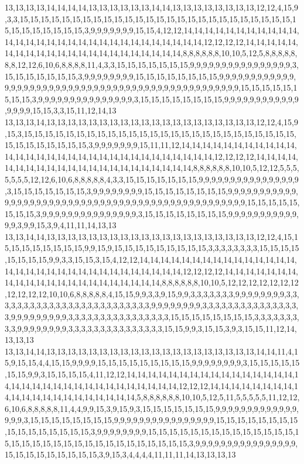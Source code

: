 13,13,13,13,14,14,14,14,13,13,13,13,13,13,14,14,13,13,13,13,13,13,13,13,12,12,4,15,9,3,3,15,15,15,15,15,15,15,15,15,15,15,15,15,15,15,15,15,15,15,15,15,15,15,15,15,15,15,15,15,15,15,15,15,15,3,9,9,9,9,9,9,9,15,15,4,12,12,14,14,14,14,14,14,14,14,14,14,14,14,14,14,14,14,14,14,14,14,14,14,14,14,14,14,14,14,14,14,12,12,12,12,14,14,14,14,14,14,14,14,14,14,14,14,14,14,14,14,14,14,14,14,14,14,8,8,8,8,8,8,10,10,5,12,5,8,8,8,8,8,8,8,12,12,6,10,6,8,8,8,8,11,4,3,3,15,15,15,15,15,15,15,9,9,9,9,9,9,9,9,9,9,9,9,9,9,9,9,3,15,15,15,15,15,15,15,3,9,9,9,9,9,9,9,9,15,15,15,15,15,15,15,15,9,9,9,9,9,9,9,9,9,9,9,9,9,9,9,9,9,9,9,9,9,9,9,9,9,9,9,9,9,9,9,9,9,9,9,9,9,9,9,9,9,9,9,9,9,9,9,9,9,15,15,15,15,15,15,15,15,3,9,9,9,9,9,9,9,9,9,9,9,9,9,9,9,3,15,15,15,15,15,15,15,15,9,9,9,9,9,9,9,9,9,9,9,9,9,9,9,9,15,15,3,3,15,11,12,14,13
13,13,13,14,13,13,13,13,13,13,13,13,13,13,13,13,13,13,13,13,13,13,13,13,12,12,4,15,9,15,3,15,15,15,15,15,15,15,15,15,15,15,15,15,15,15,15,15,15,15,15,15,15,15,15,15,15,15,15,15,15,15,15,15,15,3,9,9,9,9,9,9,9,15,11,11,12,14,14,14,14,14,14,14,14,14,14,14,14,14,14,14,14,14,14,14,14,14,14,14,14,14,14,14,14,14,14,14,12,12,12,12,14,14,14,14,14,14,14,14,14,14,14,14,14,14,14,14,14,14,14,14,14,14,8,8,8,8,8,8,10,10,5,12,12,5,5,5,5,5,5,5,12,12,6,10,6,8,8,8,8,8,4,3,3,15,15,15,15,15,15,15,9,9,9,9,9,9,9,9,9,9,9,9,9,9,9,9,3,15,15,15,15,15,15,15,3,9,9,9,9,9,9,9,9,15,15,15,15,15,15,15,15,9,9,9,9,9,9,9,9,9,9,9,9,9,9,9,9,9,9,9,9,9,9,9,9,9,9,9,9,9,9,9,9,9,9,9,9,9,9,9,9,9,9,9,9,9,9,9,9,9,15,15,15,15,15,15,15,15,3,9,9,9,9,9,9,9,9,9,9,9,9,9,9,9,3,15,15,15,15,15,15,15,15,9,9,9,9,9,9,9,9,9,9,9,9,9,3,9,9,15,3,9,4,11,11,14,13,13
13,13,14,14,13,13,13,13,13,13,13,13,13,13,13,13,13,13,13,13,13,13,13,13,12,12,4,15,15,15,15,15,15,15,15,15,9,9,15,9,15,15,15,15,15,15,15,15,15,3,3,3,3,3,3,3,3,15,15,15,15,15,15,15,15,9,9,3,3,15,15,3,15,4,12,12,14,14,14,14,14,14,14,14,14,14,14,14,14,14,14,14,14,14,14,14,14,14,14,14,14,14,14,14,14,14,14,14,12,12,12,12,14,14,14,14,14,14,14,14,14,14,14,14,14,14,14,14,14,14,14,14,14,14,8,8,8,8,8,8,10,10,5,12,12,12,12,12,12,12,12,12,12,12,10,10,6,8,8,8,8,8,4,15,15,9,9,3,3,9,15,9,9,3,3,3,3,3,3,3,9,9,9,9,9,9,9,9,3,3,3,3,3,3,3,3,3,3,3,3,3,3,3,3,3,3,3,3,3,3,3,3,3,9,9,9,9,9,9,9,9,3,3,3,3,3,3,3,3,3,3,3,3,3,3,3,3,9,9,9,9,9,9,9,9,9,3,3,3,3,3,3,3,3,3,3,3,3,3,3,3,3,15,15,15,15,15,15,15,15,3,3,3,3,3,3,3,3,3,9,9,9,9,9,9,9,9,3,3,3,3,3,3,3,3,3,3,3,3,3,3,3,15,15,9,9,3,15,15,3,9,3,15,15,11,12,14,13,13,13
13,13,14,14,13,13,13,13,13,13,13,13,13,13,13,13,13,13,13,13,13,13,13,13,14,14,11,4,15,9,15,15,4,4,15,15,9,9,9,9,15,15,15,15,15,15,15,15,15,9,9,9,9,9,9,9,9,3,15,15,15,15,15,15,15,9,9,3,15,15,15,15,4,11,12,12,14,14,14,14,14,14,14,14,14,14,14,14,14,14,14,14,14,14,14,14,14,14,14,14,14,14,14,14,14,14,14,14,14,12,12,12,14,14,14,14,14,14,14,14,14,14,14,14,14,14,14,14,14,14,14,14,14,5,8,8,8,8,8,8,10,10,5,12,5,11,5,5,5,5,5,11,12,12,6,10,6,8,8,8,8,8,11,4,4,9,9,15,3,9,15,9,3,15,15,15,15,15,15,15,9,9,9,9,9,9,9,9,9,9,9,9,9,9,9,9,3,15,15,15,15,15,15,15,15,9,9,9,9,9,9,9,9,9,9,9,9,9,9,9,9,15,15,15,15,15,15,15,15,15,15,15,15,15,15,15,15,3,9,9,9,9,9,9,9,9,15,15,15,15,15,15,15,15,15,15,15,15,15,15,15,15,15,15,15,15,15,15,15,15,15,15,15,15,15,15,15,15,3,9,9,9,9,9,9,9,9,9,9,9,9,9,9,9,9,15,15,15,15,15,15,15,15,15,3,9,15,3,4,4,4,4,11,11,11,14,13,13,13,13
